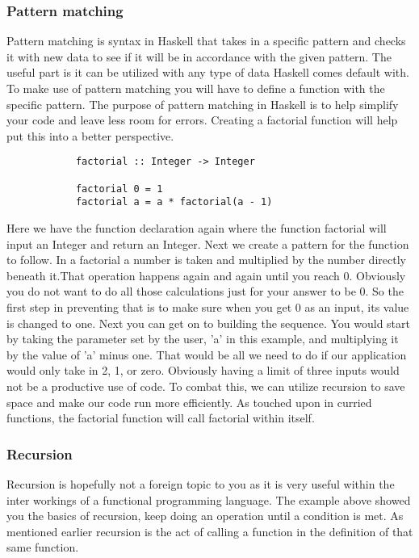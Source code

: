 \documentclass{article}
\begin{document}
        \subsubsection{Pattern matching}
        Pattern matching is syntax in Haskell that takes in a specific pattern and checks it with new data to see if it will be in accordance with the given pattern. The useful part is it can be utilized with any type of data Haskell comes default with. To make use of pattern matching you will have to define a function with the specific pattern. The purpose of pattern matching in Haskell is to help simplify your code and leave less room for errors. Creating a factorial function will help put this into a better perspective. 
        
        \begin{lstlisting}
            factorial :: Integer -> Integer 
            
            factorial 0 = 1
            factorial a = a * factorial(a - 1)
        \end{lstlisting}
        
        \noindent Here we have the function declaration again where the function factorial will input an Integer and return an Integer. Next we create a pattern for the function to follow. In a factorial a number is taken and multiplied by the number directly beneath it.That operation happens again and again until you reach 0. Obviously you do not want to do all those calculations just for your answer to be 0. So the first step in preventing that is to make sure when you get 0 as an input, its value is changed to one. Next you can get on to building the sequence. You would start by taking the parameter set by the user, 'a' in this example, and multiplying it by the value of 'a' minus one. That would be all we need to do if our application would only take in 2, 1, or zero. Obviously having a limit of three inputs would not be a productive use of code. To combat this, we can utilize recursion to save space and make our code run more efficiently. As touched upon in curried functions, the factorial function will call factorial within itself. 
        
        \subsubsection{Recursion}
        Recursion is hopefully not a foreign topic to you as it is very useful within the inter workings of a functional programming language. The example above showed you the basics of recursion, keep doing an operation until a condition is met. As mentioned earlier recursion is the act of calling a function in the definition of that same function.
        
\end{document}
